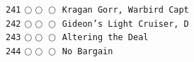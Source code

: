 \documentclass[a4paper,landscape]{article}
\begin{document}
\begin{multicols*}{5}
\texttt{241} \(\bigcirc\!\bigcirc\!\bigcirc\)  \texttt{Kragan Gorr, Warbird Capt} \vspace{-0.3mm}\\ 
\texttt{242} \(\bigcirc\!\bigcirc\!\bigcirc\)  \texttt{Gideon’s Light Cruiser, D} \vspace{-0.3mm}\\ 
\texttt{243} \(\bigcirc\!\bigcirc\!\bigcirc\)  \texttt{Altering the Deal} \vspace{-0.3mm}\\ 
\texttt{244} \(\bigcirc\!\bigcirc\!\bigcirc\)  \texttt{No Bargain} \vspace{-0.3mm}\\ 

\end{multicols*}
\end{document}

